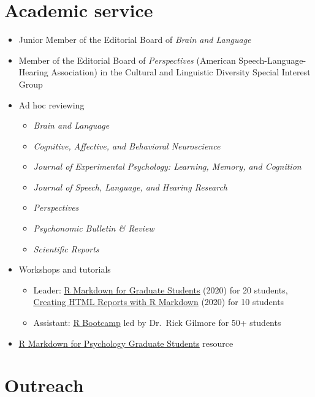 \documentclass[11pt,a4paper,]{awesome-cv}
\providecommand{\tightlist}{%
	\setlength{\itemsep}{0pt}\setlength{\parskip}{0pt}}
\begin{document}
\newpage

\section{Academic service}\label{academic-service}

\begin{itemize}
\tightlist
\item
  Junior Member of the Editorial Board of \emph{Brain and Language}
\item
  Member of the Editorial Board of \emph{Perspectives} (American
  Speech-Language-Hearing Association) in the Cultural and Linguistic
  Diversity Special Interest Group
\item
  Ad hoc reviewing

  \begin{itemize}
  \tightlist
  \item
    \emph{Brain and Language}
  \item
    \emph{Cognitive, Affective, and Behavioral Neuroscience}
  \item
    \emph{Journal of Experimental Psychology: Learning, Memory, and
    Cognition}
  \item
    \emph{Journal of Speech, Language, and Hearing Research}
  \item
    \emph{Perspectives}
  \item
    \emph{Psychonomic Bulletin \& Review}
  \item
    \emph{Scientific Reports}
  \end{itemize}
\item
  Workshops and tutorials

  \begin{itemize}
  \tightlist
  \item
    Leader:
    \href{https://github.com/hollzzar/markdown-tutorial}{\ul{R Markdown for Graduate Students}}
    (2020) for 20 students,
    \href{https://github.com/hollzzar/reports-with-markdown}{\ul{Creating HTML Reports with R Markdown}}
    (2020) for 10 students
  \item
    Assistant:
    \href{https://github.com/psu-psychology/r-bootcamp-2019}{\ul{R Bootcamp}}
    led by Dr.~Rick Gilmore for 50+ students
  \end{itemize}
\item
  \href{https://www.hzaharchuk.com/rmarkdown-guide/}{\ul{R Markdown for Psychology Graduate Students}}
  resource
\end{itemize}

\section{Outreach}\label{outreach}
\end{document}
